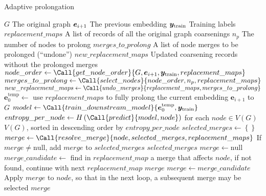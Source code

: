 \begin{algorithm*}
  \caption{Adaptive prolongation}
  \label{alg:adaptive-prolongation}
  \begin{algorithmic}
    \Require $ G $ \Comment The original graph
    \Require $ \bm{e}_{i+1} $ \Comment The previous embedding
    \Require $ \bm{y}_\mathrm{train} $ \Comment Training labels
    \Require $ replacement\_maps $ \Comment A list of records of all the original graph coarsenings
    \Require $ n_p $ \Comment The number of nodes to prolong
    \Ensure $ merges\_to\_prolong $ \Comment A list of node merges to be prolonged (\enquote{undone})
    \Ensure $ new\_replacement\_maps $ \Comment Updated coarsening records without the prolonged merges
    \Statex
    \State $ node\_order \gets \Call{get\_node\_order}{G, \bm{e}_{i+1}, \bm{y}_\mathrm{train}, replacement\_maps} $
    \State $ merges\_to\_prolong \gets \Call{select\_nodes}{node\_order, n_p, replacement\_maps} $
    \State $ new\_replacement\_maps \gets \Call{undo\_merges}{replacement\_maps, merges\_to\_prolong} $
    \Statex
        \State $ \bm{e}_0^\mathrm{temp} \gets $ use $ replacement\_maps $ to fully prolong the current embedding $ \bm{e}_{i+1} $ to $ G $
        \State $ model \gets \Call{train\_downstream\_model}{\bm{e}_0^\mathrm{temp}, \bm{y}_\mathrm{train}} $
        \State $ entropy\_per\_node \gets H \left( \Call{predict}{model, node} \right) $ for each $ node \in V \left( G \right) $
        \State \Return $ V \left( G \right) $, sorted in descending order by $ entropy\_per\_node $
    \EndFunction
    \Statex
        \State $ selected\_merges \gets \left\{ \right\} $
            \State $ merge \gets \Call{resolve\_merge}{node, selected\_merges, replacement\_maps} $
            \State If $ merge \neq \mathrm{null} $, add $ merge $ to $ selected\_merges $
        \EndFor
        \State \Return $ selected\_merges $
    \EndFunction
    \Statex
        \State $ merge \gets \mathrm{null} $
            \State $ merge\_candidate \gets $ find in $ replacement\_map $ a merge that affects $ node $, if not found, continue with next $ replacement\_map $
                \State \Return $ merge $
            \EndIf
            \State $ merge \gets merge\_candidate $
            \State Apply $ merge $ to $ node $, so that in the next loop, a subsequent merge may be selected
        \EndFor
        \State \Return $ merge $
    \EndFunction
  \end{algorithmic}
\end{algorithm*}

